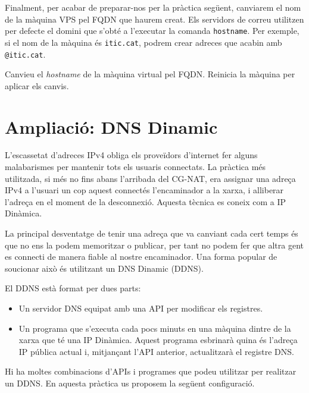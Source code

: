 \documentclass{practicaitic}
\begin{document}
Finalment, per acabar de preparar-nos per la pràctica següent, canviarem el
nom de la màquina VPS pel FQDN que haurem creat. Els servidors de correu
utilitzen per defecte el domini que s'obté a l'executar la comanda
\verb|hostname|. Per exemple, si el nom de la màquina és \verb|itic.cat|,
podrem crear adreces que acabin amb \texttt{@itic.cat}.

\begin{tasca}
  Canvieu el \textit{hostname} de la màquina virtual pel FQDN. Reinicia
  la màquina per aplicar els canvis.
\end{tasca}

\section{Ampliació: DNS Dinamic}

L'escassetat d'adreces IPv4 obliga els proveïdors d'internet fer alguns
malabarismes per mantenir tots els usuaris connectats. La pràctica més
utilitzada, si més no fins abans l'arribada del CG-NAT, era assignar una
adreça IPv4 a l'usuari un cop aquest connectés l'encaminador a la xarxa, i
alliberar l'adreça en el moment de la desconnexió. Aquesta tècnica es coneix
com a IP Dinàmica.

La principal desventatge de tenir una adreça que va canviant cada cert temps és
que no ens la podem memoritzar o publicar, per tant no podem fer que altra gent
es connecti de manera fiable al nostre encaminador. Una forma popular de
so\lgem ucionar això és utilitzant un DNS Dinamic (DDNS).

El DDNS està format per dues parts:
\begin{itemize}
  \item Un servidor DNS equipat amb una API per modificar els registres.
  \item Un programa que s'executa cada pocs minuts en una màquina dintre de
  la xarxa que té una IP Dinàmica. Aquest programa esbrinarà quina és
  l'adreça IP pública actual i, mitjançant l'API anterior, actualitzarà
  el registre DNS.
\end{itemize}

Hi ha moltes combinacions d'APIs i programes que podeu utilitzar per
realitzar un DDNS. En aquesta pràctica us proposem la següent configuració.
\end{document}
